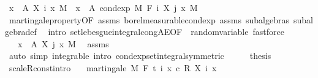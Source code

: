 \begin{isabellebody}
\ {\isachardoublequoteopen}{\isasymintegral}x\ {\isasymin}\ A{\isachardot}{\kern0pt}\ X\ i\ x\ {\isasympartial}M\ {\isacharequal}{\kern0pt}\ {\isasymintegral}x\ {\isasymin}\ A{\isachardot}{\kern0pt}\ cond{\isacharunderscore}{\kern0pt}exp\ M\ {\isacharparenleft}{\kern0pt}F\ i{\isacharparenright}{\kern0pt}\ {\isacharparenleft}{\kern0pt}X\ j{\isacharparenright}{\kern0pt}\ x\ {\isasympartial}M{\isachardoublequoteclose}\ \isamarkupfalse%
\ martingale{\isacharunderscore}{\kern0pt}property{\isacharbrackleft}{\kern0pt}OF\ assms{\isacharparenleft}{\kern0pt}{}{\isacharcomma}{\kern0pt}{}{\isacharparenright}{\kern0pt}{\isacharbrackright}{\kern0pt}\ borel{\isacharunderscore}{\kern0pt}measurable{\isacharunderscore}{\kern0pt}cond{\isacharunderscore}{\kern0pt}exp{\isacharprime}{\kern0pt}\ assms\ subalgebras\ subalgebra{\isacharunderscore}{\kern0pt}def\ \isamarkupfalse%
\ {\isacharparenleft}{\kern0pt}intro\ set{\isacharunderscore}{\kern0pt}lebesgue{\isacharunderscore}{\kern0pt}integral{\isacharunderscore}{\kern0pt}cong{\isacharunderscore}{\kern0pt}AE{\isacharbrackleft}{\kern0pt}OF\ {\isacharunderscore}{\kern0pt}\ random{\isacharunderscore}{\kern0pt}variable{\isacharbrackright}{\kern0pt}{\isacharparenright}{\kern0pt}\ fastforce{\isacharplus}{\kern0pt}\isanewline
\ \ \isamarkupfalse%
\ \isamarkupfalse%
\ {\isachardoublequoteopen}{\isachardot}{\kern0pt}{\isachardot}{\kern0pt}{\isachardot}{\kern0pt}\ {\isacharequal}{\kern0pt}\ {\isasymintegral}x\ {\isasymin}\ A{\isachardot}{\kern0pt}\ X\ j\ x\ {\isasympartial}M{\isachardoublequoteclose}\ \isamarkupfalse%
\ assms\ \isamarkupfalse%
\ {\isacharparenleft}{\kern0pt}auto\ simp{\isacharcolon}{\kern0pt}\ integrable\ intro{\isacharcolon}{\kern0pt}\ cond{\isacharunderscore}{\kern0pt}exp{\isacharunderscore}{\kern0pt}set{\isacharunderscore}{\kern0pt}integral{\isacharbrackleft}{\kern0pt}symmetric{\isacharbrackright}{\kern0pt}{\isacharparenright}{\kern0pt}\isanewline
\ \ \isamarkupfalse%
\ \isamarkupfalse%
\ {\isacharquery}{\kern0pt}thesis\ \isacommand{{\isachardot}{\kern0pt}}\isamarkupfalse%
\isanewline
{}\isamarkupfalse%
%
\endisatagproof
{\isafoldproof}%
%
\isadelimproof
\isanewline
%
\endisadelimproof
\isanewline
{}\isamarkupfalse%
\ scaleR{\isacharunderscore}{\kern0pt}const{\isacharbrackleft}{\kern0pt}intro{\isacharbrackright}{\kern0pt}{\isacharcolon}{\kern0pt}\isanewline
\ \ \ {\isachardoublequoteopen}martingale\ M\ F\ t\ {\isacharparenleft}{\kern0pt}{\isasymlambda}i\ x{\isachardot}{\kern0pt}\ c\ {\isacharasterisk}{\kern0pt}\isactrlsub R\ X\ i\ x{\isacharparenright}{\kern0pt}{\isachardoublequoteclose}\isanewline

\end{isabellebody}
